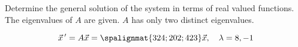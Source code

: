 \documentclass[12pt]{exam}
\begin{document}
    




\newpage

\begin{questions}

    \question Determine the general solution of the system in terms of real valued functions. The eigenvalues of $A$ are given. $A$ has only two distinct eigenvalues. 
 	
 	$$\vec x \, ' = A \vec x = \spalignmat{3 2 4;2 0 2;4 2 3} \vec x, \quad \lambda = 8, -1$$
    
    
\end{questions}
\end{document}

